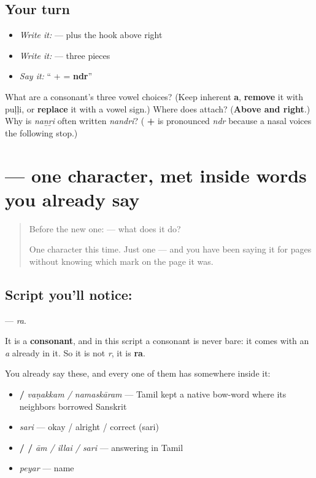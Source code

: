 \subsection*{Your turn}
\begin{itemize}
\raggedright
  \item \emph{Write it:}  —  plus the hook above right
  \item \emph{Write it:} \textbf{} — three pieces
  \item \emph{Say it:} \textquotedblleft{} +  = \textbf{ndr}\textquotedblright{}
\end{itemize}

\begin{tcolorbox}[breakable,colback=teal!4,colframe=teal!35!black,title={Before you move on}]
What are a consonant's three vowel choices? (Keep inherent \textbf{a}, \textbf{remove} it with puḷḷi, or \textbf{replace} it with a vowel sign.) Where does \textbf{} attach? (\textbf{Above and right}.) Why is \emph{naṉṟi} often written \emph{nandri}? (\textbf{ + } is pronounced \emph{ndr} because a nasal voices the following stop.)
\end{tcolorbox}
\section[\texorpdfstring{\ta{ர} (ra)}{ர (ra)}]{ — one character, met inside words you already say}

\label{lesson:TA-S117-letter-ra}



\begin{quote}
Before the new one:  — what does it do?

One character this time. Just one — and you have been saying it for pages without knowing which mark on the page it was.
\end{quote}

\subsection*{Script you'll notice: }
\textbf{} — \emph{ra}.

It is a \textbf{consonant}, and in this script a consonant is never bare: it comes with an \emph{a} already in it. So it is not \emph{r}, it is \textbf{ra}.

You already say these, and every one of them has  somewhere inside it:

\begin{itemize}
\raggedright
  \item \textbf{ / } \emph{vaṇakkam / namaskāram} — Tamil kept a native bow-word where its neighbors borrowed Sanskrit
  \item \textbf{} \emph{sari} — okay / alright / correct (sari)
  \item \textbf{ /  / } \emph{ām / illai / sari} — answering in Tamil
  \item \textbf{} \emph{peyar} — name
\end{itemize}

